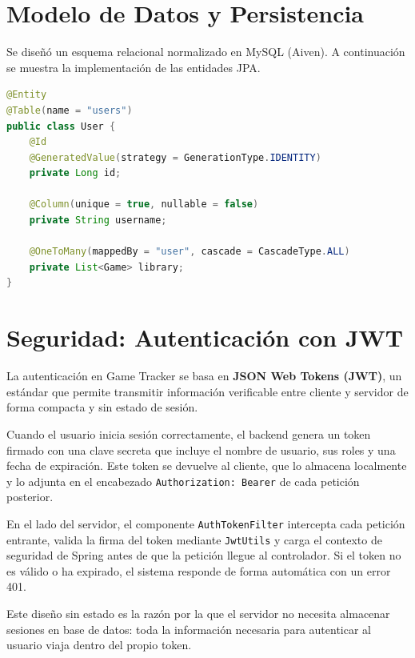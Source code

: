 \section{Modelo de Datos y Persistencia}

Se diseñó un esquema relacional normalizado en MySQL (Aiven). A continuación
se muestra la implementación de las entidades JPA.

\begin{lstlisting}[language=Java, caption=Entidad de Usuario y relaciones]
@Entity
@Table(name = "users")
public class User {
    @Id
    @GeneratedValue(strategy = GenerationType.IDENTITY)
    private Long id;

    @Column(unique = true, nullable = false)
    private String username;

    @OneToMany(mappedBy = "user", cascade = CascadeType.ALL)
    private List<Game> library;
}
\end{lstlisting}

\section{Seguridad: Autenticación con JWT}

La autenticación en Game Tracker se basa en \textbf{JSON Web Tokens (JWT)},
un estándar que permite transmitir información verificable entre cliente y
servidor de forma compacta y sin estado de sesión.

Cuando el usuario inicia sesión correctamente, el backend genera un token
firmado con una clave secreta que incluye el nombre de usuario, sus roles y
una fecha de expiración. Este token se devuelve al cliente, que lo almacena
localmente y lo adjunta en el encabezado \texttt{Authorization: Bearer} de
cada petición posterior.

En el lado del servidor, el componente \texttt{AuthTokenFilter} intercepta cada
petición entrante, valida la firma del token mediante \texttt{JwtUtils} y carga
el contexto de seguridad de Spring antes de que la petición llegue al
controlador. Si el token no es válido o ha expirado, el sistema responde de
forma automática con un error 401.

Este diseño sin estado es la razón por la que el servidor no necesita almacenar
sesiones en base de datos: toda la información necesaria para autenticar al
usuario viaja dentro del propio token.

